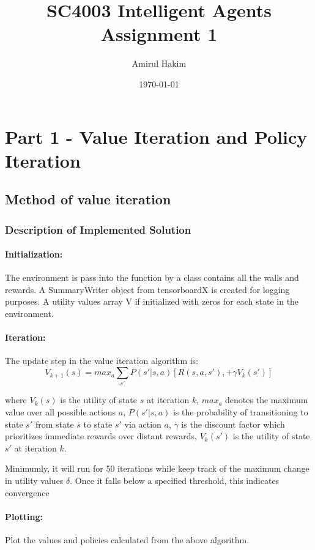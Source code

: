 \documentclass{article}
\title{SC4003 Intelligent Agents Assignment 1}
\author{Amirul Hakim}
\date{\today}
\begin{document}
\maketitle

\section{Part 1 - Value Iteration and Policy Iteration}

\subsection{Method of value iteration}

\subsubsection{Description of Implemented Solution}

\paragraph{Initialization:} The environment is pass into the function by a class contains all the walls and rewards. A SummaryWriter object from tensorboardX is created for logging purposes. A utility values array V if initialized with zeros for each state in the environment.

\paragraph{Iteration:} The update step in the value iteration algorithm is:
\[V_{k+1}(s) = max_a \sum_{s'}P(s'|s, a) [R(s, a, s'), + \gamma V_k(s')] \]

where $V_k(s)$ is the utility of state $s$ at iteration $k$, $max_a$ denotes the maximum value over all possible actions $a$, $P(s' | s, a) $ is the probability of transitioning to state $s'$ from state $s$ to state $s'$ via action $a$, $\gamma$ is the discount factor which prioritizes immediate rewards over distant rewards, $V_k(s')$ is the utility of state $s'$ at iteration $k$.

Minimumly, it will run for 50 iterations while keep track of the maximum change in utility values $\delta$. Once it falls below a specified threshold, this indicates convergence

\paragraph{Plotting:} Plot the values and policies calculated from the above algorithm.
\end{document}
